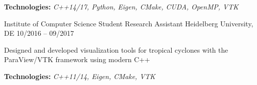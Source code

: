 \begin{cventries}
{\begin{cvitems}
        \item {\textbf{Technologies:} \textit{C++14/17, Python, Eigen, CMake, CUDA, OpenMP, VTK}}
      \end{cvitems}
    }
    \cventry
    {Institute of Computer Science}
    {Student Research Assistant}
    {Heidelberg University, DE}
    {10/2016 -- 09/2017}
    {
      \begin{cvitems}
        \item {Designed and developed visualization tools for tropical cyclones with the ParaView/VTK framework using modern C++}
        \item {\textbf{Technologies:} \textit{C++11/14, Eigen, CMake, VTK}}
      \end{cvitems}
    }
\end{cventries}
